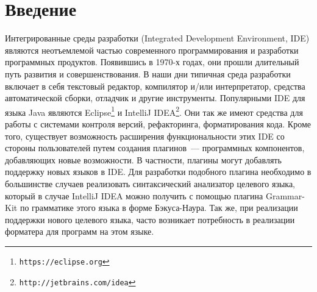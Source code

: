 \section*{Введение}
\lstset{basicstyle=\normalsize\ttfamily, columns=fullflexible}

Интегрированные среды разработки (Integrated Development Environment, IDE) являются неотъемлемой частью современного программирования и разработки программных продуктов. 
Появившись в 1970-х годах, они прошли длительный путь развития и совершенствования. 
В наши дни типичная среда разработки включает в себя текстовый редактор, компилятор и/или интерпретатор, средства автоматической сборки, отладчик и другие инструменты. 
Популярными IDE для языка Java являются Eclipse\footnote{\texttt{https://eclipse.org}} и IntelliJ IDEA\footnote{\texttt{http://jetbrains.com/idea}}.
Они так же имеют средства для работы с системами контроля версий, рефакторинга, форматирования кода. 
Кроме того, существует возможность расширения функциональности этих IDE со стороны пользователей путем создания плагинов~--- программных компонентов, добавляющих новые возможности.
В частности, плагины могут добавлять поддержку новых языков в IDE.
Для разработки подобного плагина необходимо в большинстве случаев реализовать синтаксический анализатор целевого языка, который в случае IntelliJ IDEA можно получить с помощью плагина Grammar-Kit по грамматике этого языка в форме Бэкуса-Наура.
Так же, при реализации поддержки нового целевого языка, часто возникает потребность в реализации форматера для программ на этом языке.

